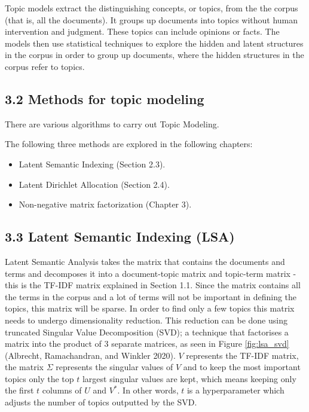 \documentclass[
]{article}
\providecommand{\tightlist}{%
  \setlength{\itemsep}{0pt}\setlength{\parskip}{0pt}}
\begin{document}
Topic models extract the distinguishing concepts, or topics, from the
the corpus (that is, all the documents). It groups up documents into
topics without human intervention and judgment. These topics can include
opinions or facts. The models then use statistical techniques to explore
the hidden and latent structures in the corpus in order to group up
documents, where the hidden structures in the corpus refer to topics.

\hypertarget{methods-for-topic-modeling}{%
\subsection{3.2 Methods for topic
modeling}\label{methods-for-topic-modeling}}

There are various algorithms to carry out Topic Modeling.

The following three methods are explored in the following chapters:

\begin{itemize}
\tightlist
\item
  Latent Semantic Indexing (Section 2.3).
\item
  Latent Dirichlet Allocation (Section 2.4).
\item
  Non-negative matrix factorization (Chapter 3).
\end{itemize}

\hypertarget{latent-semantic-indexing-lsa}{%
\subsection{3.3 Latent Semantic Indexing
(LSA)}\label{latent-semantic-indexing-lsa}}

Latent Semantic Analysis takes the matrix that contains the documents
and terms and decomposes it into a document-topic matrix and topic-term
matrix - this is the TF-IDF matrix explained in Section 1.1. Since the
matrix contains all the terms in the corpus and a lot of terms will not
be important in defining the topics, this matrix will be sparse. In
order to find only a few topics this matrix needs to undergo
dimensionality reduction. This reduction can be done using truncated
Singular Value Decomposition (SVD); a technique that factorises a matrix
into the product of 3 separate matrices, as seen in Figure
\ref{fig:lsa_svd} (Albrecht, Ramachandran, and Winkler 2020). \(V\)
represents the TF-IDF matrix, the matrix \(\Sigma\) represents the
singular values of \(V\) and to keep the most important topics only the
top \(t\) largest singular values are kept, which means keeping only the
first \(t\) columns of \(U\) and \(V^*\). In other words, \(t\) is a
hyperparameter which adjusts the number of topics outputted by the SVD.
\end{document}
